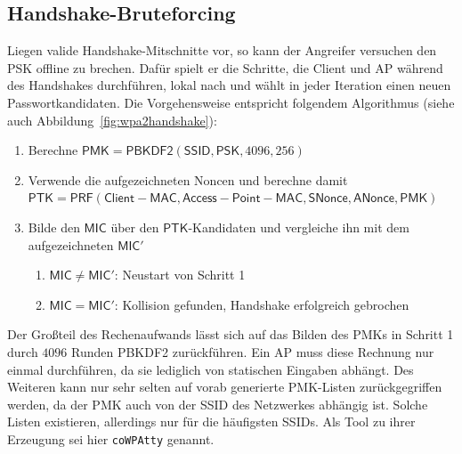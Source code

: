 \subsection{Handshake-Bruteforcing}\label{subs:cracking}
Liegen valide Handshake-Mitschnitte vor, so kann der Angreifer versuchen den PSK offline zu brechen.
Dafür spielt er die Schritte, die Client und AP während des Handshakes durchführen, lokal nach und wählt in jeder Iteration einen neuen Passwortkandidaten.
Die Vorgehensweise entspricht folgendem Algorithmus (siehe auch Abbildung~\ref{fig:wpa2handshake}):
\begin{enumerate}
	\item Berechne $\mathsf{PMK} = \mathsf{PBKDF2}(\mathsf{SSID}, \mathsf{PSK}, 4096, 256)$
	\item Verwende die aufgezeichneten Noncen und berechne damit \\$\mathsf{PTK} = \mathsf{PRF}(\mathsf{Client-MAC},  \mathsf{Access-Point-MAC}, \mathsf{SNonce}, \mathsf{ANonce}, \mathsf{PMK})$
	\item Bilde den $\mathsf{MIC}$ über den $\mathsf{PTK}$-Kandidaten und vergleiche ihn mit dem aufgezeichneten $\mathsf{MIC'}$
	\begin{enumerate}
		\item $\mathsf{MIC} \neq \mathsf{MIC'}$: Neustart von Schritt 1
		\item $\mathsf{MIC} = \mathsf{MIC'}$: Kollision gefunden, Handshake erfolgreich gebrochen
	\end{enumerate}
\end{enumerate}
Der Großteil des Rechenaufwands lässt sich auf das Bilden des PMKs in Schritt 1 durch $4096$ Runden PBKDF2 zurückführen. Ein AP muss diese Rechnung nur einmal durchführen, da sie lediglich von statischen Eingaben abhängt. %
Des Weiteren kann nur sehr selten auf vorab generierte PMK-Listen zurückgegriffen werden, da der PMK auch von der SSID des Netzwerkes abhängig ist. Solche Listen existieren, allerdings nur für die häufigsten SSIDs. Als Tool zu ihrer Erzeugung sei hier \texttt{coWPAtty} genannt.\\

